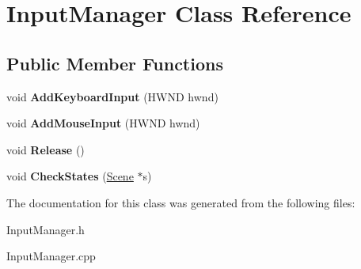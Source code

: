 \hypertarget{class_input_manager}{\section{Input\-Manager Class Reference}
\label{class_input_manager}
}
\subsection*{Public Member Functions}
\begin{DoxyCompactItemize}
\item 
\hypertarget{class_input_manager_ad37c9defa531918e2e990dad9d719584}{void {\bfseries Add\-Keyboard\-Input} (H\-W\-N\-D hwnd)}\label{class_input_manager_ad37c9defa531918e2e990dad9d719584}

\item 
\hypertarget{class_input_manager_a65b15a6ebdad0cc1a72f0b6e81640296}{void {\bfseries Add\-Mouse\-Input} (H\-W\-N\-D hwnd)}\label{class_input_manager_a65b15a6ebdad0cc1a72f0b6e81640296}

\item 
\hypertarget{class_input_manager_a01789f6350560c18a10f01847a200d39}{void {\bfseries Release} ()}\label{class_input_manager_a01789f6350560c18a10f01847a200d39}

\item 
\hypertarget{class_input_manager_ae8618cf33262a21563e30dff2eac4456}{void {\bfseries Check\-States} (\hyperlink{class_scene}{Scene} $\ast$s)}\label{class_input_manager_ae8618cf33262a21563e30dff2eac4456}

\end{DoxyCompactItemize}


The documentation for this class was generated from the following files\-:\begin{DoxyCompactItemize}
\item 
Input\-Manager.\-h\item 
Input\-Manager.\-cpp\end{DoxyCompactItemize}

